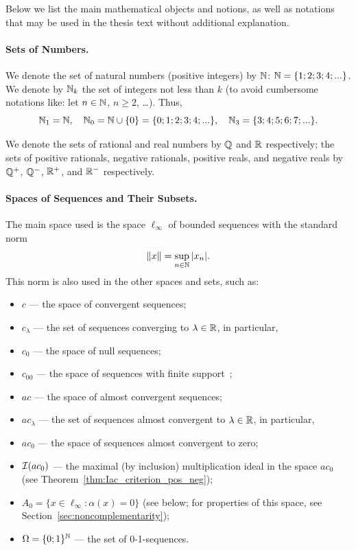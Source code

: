 Below we list the main mathematical objects and notions,
as well as notations that may be used in the thesis text without additional explanation.

\paragraph{Sets of Numbers.}
We denote the set of natural numbers (positive integers) by \(\mathbb{N}\): \(\mathbb{N} = \{1;2;3;4;...\}\).
We denote by \(\mathbb{N}_k\) the set of integers not less than \(k\) (to avoid cumbersome notations like: let \(n\in \mathbb{N}\), \(n \geq 2\), …).
Thus,
\begin{equation}
	\mathbb{N}_1 = \mathbb{N}
	,
	\quad
	\mathbb{N}_0 = \mathbb{N} \cup\{0\} = \{0;1;2;3;4;...\}
	,
	\quad
	\mathbb{N}_3 = \{3;4;5;6;7;...\}
	.
\end{equation}

We denote the sets of rational and real numbers by \(\mathbb{Q}\) and \(\mathbb{R}\) respectively;
the sets of positive rationals, negative rationals,
positive reals, and negative reals by \(\mathbb{Q}^+\), \(\mathbb{Q}^-\), \(\mathbb{R}^+\), and \(\mathbb{R}^-\) respectively.

\paragraph{Spaces of Sequences and Their Subsets.}

The main space used is the space \(\ell_\infty\) of bounded sequences with the standard norm
\begin{equation}
	\|x\| = \sup_{n\in\mathbb{N}} |x_n|
	.
\end{equation}
This norm is also used in the other spaces and sets, such as:
\begin{itemize}
	\item
		\(c\) — the space of convergent sequences;
	\item
		\(c_\lambda\) — the set of sequences converging to \(\lambda \in \mathbb{R}\), in particular,
	\item
		\(c_0\) — the space of null sequences;
	\item
		\(c_{00}\) — the space of sequences with finite support~\cite[Theorem 4]{alekhno2017order};
	\item
		\(ac\) — the space of almost convergent sequences;
	\item
		\(ac_\lambda\) — the set of sequences almost convergent to \(\lambda \in \mathbb{R}\), in particular,
	\item
		\(ac_0\) — the space of sequences almost convergent to zero;
	\item
		\(\mathcal{I}(ac_0)\) — the maximal (by inclusion) multiplication ideal in the space \(ac_0\) (see Theorem~\ref{thm:Iac_criterion_pos_neg});
	\item
		\(A_0 = \{ x\in\ell_\infty : \alpha(x) = 0\}\) (see below; for properties of this space, see Section~\ref{sec:noncomplementarity});
	\item
		\(\Omega = \{0;1\}^{\mathbb{N}}\) — the set of 0-1-sequences.
\end{itemize}

